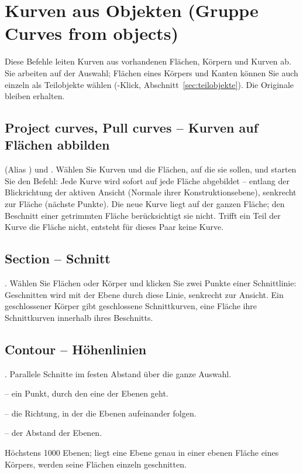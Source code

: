 \section{Kurven aus Objekten (Gruppe Curves from objects)}\label{sec:gruppe-derive}

Diese Befehle leiten Kurven aus vorhandenen Flächen, Körpern und Kurven ab. Sie arbeiten auf der
Auswahl; Flächen eines Körpers und Kanten können Sie auch einzeln als Teilobjekte wählen
(-Klick, Abschnitt~\ref{sec:teilobjekte}). Die Originale bleiben erhalten.

\subsection{Project curves, Pull curves -- Kurven auf Flächen abbilden}\label{sec:cmd-project}
 (Alias ) und . Wählen Sie Kurven und die Flächen, auf die sie
sollen, und starten Sie den Befehl: Jede Kurve wird sofort auf jede Fläche abgebildet --
 entlang der Blickrichtung der aktiven Ansicht (Normale ihrer Konstruktionsebene),
 senkrecht zur Fläche (nächste Punkte). Die neue Kurve liegt auf der ganzen Fläche; den
Beschnitt einer getrimmten Fläche berücksichtigt sie nicht. Trifft ein Teil der Kurve die Fläche
nicht, entsteht für dieses Paar keine Kurve.

\subsection{Section -- Schnitt}\label{sec:cmd-section}
. Wählen Sie Flächen oder Körper und klicken Sie zwei Punkte einer Schnittlinie:
Geschnitten wird mit der Ebene durch diese Linie, senkrecht zur Ansicht. Ein geschlossener Körper
gibt geschlossene Schnittkurven, eine Fläche ihre Schnittkurven innerhalb ihres Beschnitts.

\subsection{Contour -- Höhenlinien}\label{sec:cmd-contour}
. Parallele Schnitte im festen Abstand über die ganze Auswahl.
\begin{schritte}
\item {} -- ein Punkt, durch den eine der Ebenen geht.
\item {} -- die Richtung, in der die Ebenen
  aufeinander folgen.
\item {} -- der Abstand der Ebenen.
\end{schritte}
Höchstens 1000 Ebenen; liegt eine Ebene genau in einer ebenen Fläche eines Körpers, werden seine
Flächen einzeln geschnitten.

